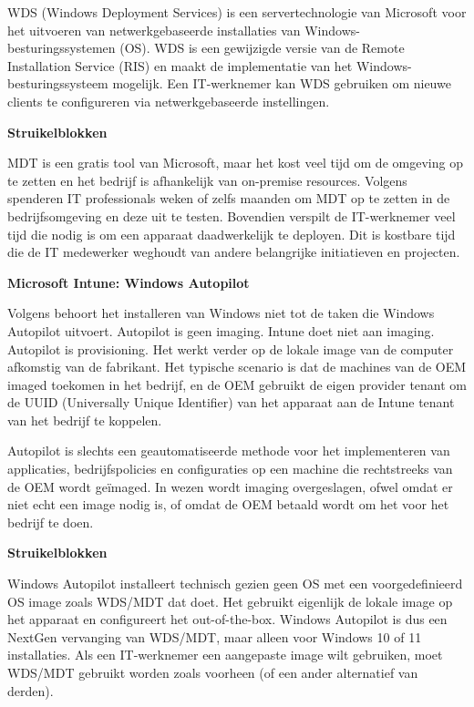 WDS (Windows Deployment Services) is een servertechnologie van Microsoft voor het uitvoeren van netwerkgebaseerde installaties van Windows-besturingssystemen (OS). WDS is een gewijzigde versie van de Remote Installation Service (RIS) en maakt de implementatie van het Windows-besturingssysteem mogelijk. Een IT-werknemer kan WDS gebruiken om nieuwe clients te configureren via netwerkgebaseerde instellingen.\autocite{Christian2021}

\textbf{Struikelblokken}

MDT is een gratis tool van Microsoft, maar het kost veel tijd om de omgeving op te zetten en het bedrijf is afhankelijk van on-premise resources. Volgens \textcite{Dunford2022} spenderen IT professionals weken of zelfs maanden om MDT op te zetten in de bedrijfsomgeving en deze uit te testen. Bovendien verspilt de IT-werknemer veel tijd die nodig is om een apparaat daadwerkelijk te deployen. Dit is kostbare tijd die de IT medewerker weghoudt van andere belangrijke initiatieven en projecten.



\textbf{Microsoft Intune: Windows Autopilot}

Volgens \textcite{LanceHarmstrong2021} behoort het installeren van Windows niet tot de taken die Windows Autopilot uitvoert. Autopilot is geen imaging. Intune doet niet aan imaging. Autopilot is provisioning. Het werkt verder op de lokale image van de computer afkomstig van de fabrikant. Het typische scenario is dat de machines van de OEM imaged toekomen in het bedrijf, en de OEM gebruikt de eigen provider tenant om de UUID (Universally Unique Identifier) van het apparaat aan de Intune tenant van het bedrijf te koppelen.

Autopilot is slechts een geautomatiseerde methode voor het implementeren van applicaties, bedrijfspolicies en configuraties op een machine die rechtstreeks van de OEM wordt geïmaged. In wezen wordt imaging overgeslagen, ofwel omdat er niet echt een image nodig is, of omdat de OEM betaald wordt om het voor het bedrijf te doen.



\textbf{Struikelblokken}

Windows Autopilot installeert technisch gezien geen OS met een voorgedefinieerd OS image zoals WDS/MDT dat doet. Het gebruikt eigenlijk de lokale image op het apparaat en configureert het out-of-the-box. Windows Autopilot is dus een NextGen vervanging van WDS/MDT, maar alleen voor Windows 10 of 11 installaties. Als een IT-werknemer een aangepaste image wilt gebruiken, moet WDS/MDT gebruikt worden zoals voorheen (of een ander alternatief van derden).



